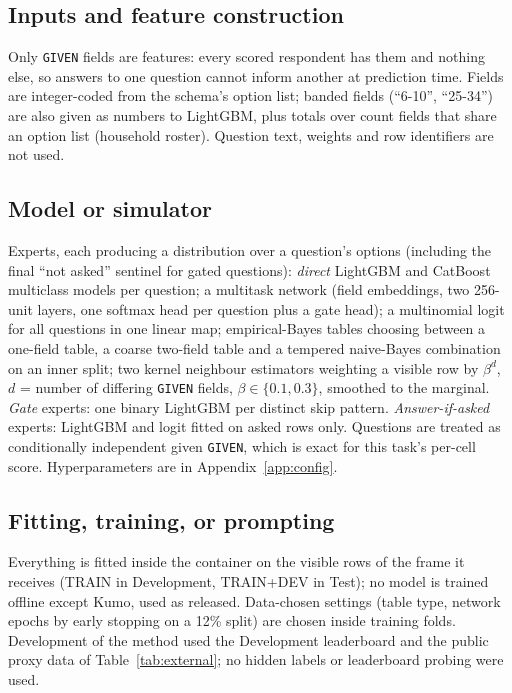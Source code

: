\documentclass{article}
\begin{document}
\subsection{Inputs and feature construction}
Only \texttt{GIVEN} fields are features: every scored respondent has them and nothing else, so answers to one question cannot inform another at prediction time. Fields are integer-coded from the schema's option list; banded fields (``6-10'', ``25-34'') are also given as numbers to LightGBM, plus totals over count fields that share an option list (household roster). Question text, weights and row identifiers are not used.

\subsection{Model or simulator}
Experts, each producing a distribution over a question's options (including the final ``not asked'' sentinel for gated questions): \emph{direct} LightGBM and CatBoost multiclass models per question; a multitask network (field embeddings, two 256-unit layers, one softmax head per question plus a gate head); a multinomial logit for all questions in one linear map; empirical-Bayes tables choosing between a one-field table, a coarse two-field table and a tempered naive-Bayes combination on an inner split; two kernel neighbour estimators weighting a visible row by $\beta^{d}$, $d$ = number of differing \texttt{GIVEN} fields, $\beta\in\{0.1,0.3\}$, smoothed to the marginal. \emph{Gate} experts: one binary LightGBM per distinct skip pattern. \emph{Answer-if-asked} experts: LightGBM and logit fitted on asked rows only. Questions are treated as conditionally independent given \texttt{GIVEN}, which is exact for this task's per-cell score. Hyperparameters are in Appendix~\ref{app:config}.

\subsection{Fitting, training, or prompting}
Everything is fitted inside the container on the visible rows of the frame it receives (TRAIN in Development, TRAIN+DEV in Test); no model is trained offline except Kumo, used as released. Data-chosen settings (table type, network epochs by early stopping on a 12\% split) are chosen inside training folds. Development of the method used the Development leaderboard and the public proxy data of Table~\ref{tab:external}; no hidden labels or leaderboard probing were used.
\end{document}
